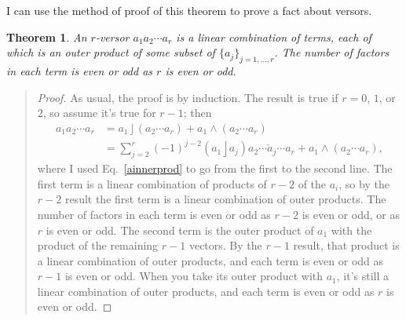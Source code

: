 \documentclass{utarticle}
\DeclareMathOperator{\lin}{\rfloor}
\DeclareMathOperator{\out}{\wedge}
\newtheorem{thm}{Theorem}
\newcommand{\bp}{\begin{quotation} \begin{proof}}
\newcommand{\ep}{\end{proof} \end{quotation}}
\begin{document}
I can use the method of proof of this theorem to prove a fact about versors.
\begin{thm}
An $r$-versor $a_1 a_2 \dotsb a_r$ is a linear combination of terms, each of which is
an outer product of some subset of $\{a_j\}_{j=1,\dotsc,r}$.  The number of factors in each
term is even or odd as $r$ is even or odd.  
\label{versorsumofblades}
\end{thm}
\bp
As usual, the proof is by induction.  The result is true if $r=0$, $1$, or $2$, so assume 
it's true for $r-1$; then
\begin{align}
a_1 a_2 \dotsb a_r & = a_1 \lin (a_2 \dotsb a_r) + a_1 \out (a_2 \dotsb a_r) \nonumber \\
                               & = \sum_{j=2}^r (-1)^{j-2} (a_1 \lin a_j) a_2 \dotsb \check{a}_j \dotsb a_r +
                                                              a_1 \out (a_2 \dotsb a_r),
\label{prodofr}
\end{align}
where I used Eq.~\eqref{ainnerprod} to go from the first to the second line.  
The first term is a linear combination of products of $r-2$ of the $a_i$, 
so by the $r-2$ result the first term is a linear combination of outer products.  
The number of factors in each term is even or odd as $r-2$ is even or odd, 
or as $r$ is even or odd.  The second term is the outer product of $a_1$ 
with the product of the remaining $r-1$ vectors.  By the $r-1$ result, 
that product is a linear combination of outer products, and each term is even
or odd as $r-1$ is even or odd.  When you take its outer product with $a_1$, 
it's still a linear combination of outer products, and each term is even or odd as
$r$ is even or odd.
\ep
\end{document}
